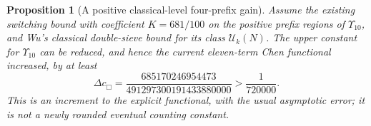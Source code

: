 \documentclass[11pt]{article}
\newtheorem{proposition}[theorem]{Proposition}
\begin{document}
\begin{proposition}[A positive classical-level four-prefix gain]
\label{prop:safe-double-sieve-u10}
Assume the existing switching bound with coefficient $K=681/100$
on the positive prefix regions of $\Upsilon_{10}$, and Wu's classical
double-sieve bound for its class $\mathcal U_k(N)$.
The upper constant for $\Upsilon_{10}$ can be reduced, and hence the
current eleven-term Chen functional increased, by at least
\begin{equation}\label{eq:safe-u10-gain}
 \Delta c_\Box
 =\frac{685170246954473}{491297300191433880000}
 >\frac1{720000}.
\end{equation}
This is an increment to the explicit functional, with the usual
asymptotic error; it is not a newly rounded eventual counting constant.
\end{proposition}
\end{document}
